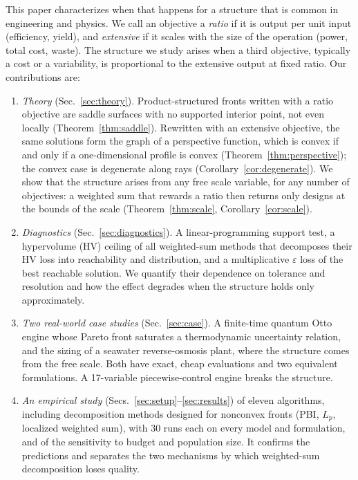 \documentclass[journal]{IEEEtran}
\theoremstyle{remark}
\begin{document}
This paper characterizes when that happens for a structure that is common in engineering and
physics. We call an objective a \emph{ratio} if it is output per unit input (efficiency, yield), and
\emph{extensive} if it scales with the size of the operation (power, total cost, waste). The
structure we study arises when a third objective, typically a cost or a variability, is proportional
to the extensive output at fixed ratio. Our contributions are:
\begin{enumerate}
\item \emph{Theory} (Sec.~\ref{sec:theory}). Product-structured fronts written with a ratio
objective are saddle surfaces with no supported interior point, not even locally
(Theorem~\ref{thm:saddle}). Rewritten with an extensive objective, the same solutions form the graph of
a perspective function, which is convex if and only if a one-dimensional profile is convex
(Theorem~\ref{thm:perspective}); the convex case is degenerate along rays
(Corollary~\ref{cor:degenerate}). We show that the structure arises from any free scale variable, for
any number of objectives: a weighted sum that rewards a ratio then returns only designs at the bounds
of the scale (Theorem~\ref{thm:scale}, Corollary~\ref{cor:scale}).
\item \emph{Diagnostics} (Sec.~\ref{sec:diagnostics}). A linear-programming support test, a
hypervolume (HV) ceiling of all weighted-sum methods that decomposes their HV loss into reachability
and distribution, and a multiplicative $\varepsilon$ loss of the best reachable solution. We quantify
their dependence on tolerance and resolution and how the effect degrades when the structure holds only
approximately.
\item \emph{Two real-world case studies} (Sec.~\ref{sec:case}). A finite-time quantum Otto engine whose
Pareto front saturates a thermodynamic uncertainty relation, and the sizing of a seawater
reverse-osmosis plant, where the structure comes from the free scale. Both have exact, cheap
evaluations and two equivalent formulations. A 17-variable piecewise-control engine breaks the
structure.
\item \emph{An empirical study} (Secs.~\ref{sec:setup}--\ref{sec:results}) of eleven algorithms,
including decomposition methods designed for nonconvex fronts (PBI, $L_p$, localized weighted sum),
with 30 runs each on every model and formulation, and of the sensitivity to budget and population
size. It confirms the predictions and separates the two mechanisms by which weighted-sum decomposition
loses quality.
\end{enumerate}
\end{document}
